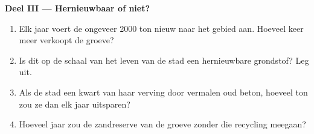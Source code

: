 \begin{problem}
\noindent\textbf{Deel III --- Hernieuwbaar of niet?}\par\nopagebreak
\begin{enumerate}[resume, beginpenalty=10000]
  \item Elk jaar voert de  ongeveer \num{2000} ton nieuw  naar het
        gebied aan. Hoeveel keer meer  verkoopt de groeve?
  \item Is dit  op de schaal van het leven van de stad een
        hernieuwbare grondstof? Leg uit.
  \item Als de stad een kwart van haar  verving door vermalen oud
        beton, hoeveel ton  zou ze dan elk jaar uitsparen?
  \item Hoeveel jaar zou de zandreserve van de groeve zonder die recycling
        meegaan?
\end{enumerate}
\end{problem}
